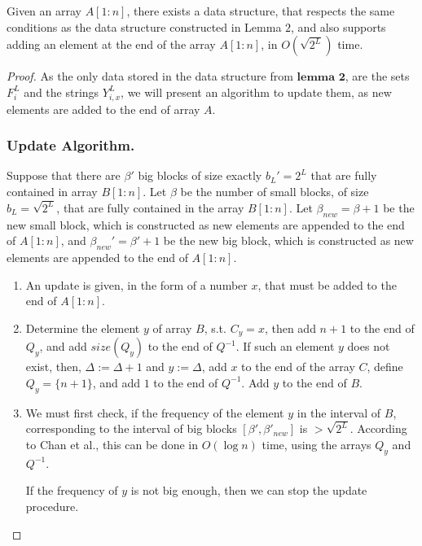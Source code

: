 \documentclass[runningheads]{llncs}
\begin{document}
\begin{lemma}
    Given an array $A[1:n]$, there exists a data structure, that respects the same conditions as the data structure constructed in 
    Lemma $2$, and also supports adding an element at the end of the array $A[1:n]$, in $O(\sqrt{2^L})$ time.

\end{lemma}
\begin{proof}
    As the only data stored in the data structure from $\textbf{lemma 2}$, are the sets $F^L_i$ and the strings $Y^L_{i,x}$, 
    we will present an algorithm to update them, as new elements are added to the end of array $A$.

    \subsubsection{Update Algorithm.}
    Suppose that there are $\beta'$ big blocks of size exactly $b_L'=2^L$ that are fully contained in array $B[1:n]$. 
    Let $\beta$ be the number of small blocks, of size $b_L=\sqrt{2^L}$, that are fully contained in the array $B[1:n]$. 
    Let $\beta_{new}=\beta+1$ be the new small block, which is constructed as new elements are appended to the end of $A[1:n]$, 
    and $\beta_{new}'=\beta'+1$ be the new big block, which is constructed as new elements are appended to the end of $A[1:n]$.

    \begin{enumerate}
        \item[] An update is given, in the form of a number $x$, that must be added to the end of $A[1:n]$.
        
        \item Determine the element $y$ of array $B$, s.t. $C_{y}=x$, then add $n+1$ to the end of $Q_{y}$, and add $size(Q_{y})$ to the end of $Q^{-1}$.
        If such an element $y$ does not exist, then, $\Delta := \Delta+1$ and $y:=\Delta$, 
        add $x$ to the end of the array $C$, define $Q_{y}=\{n+1\}$, and add $1$ to the end of $Q^{-1}$. Add $y$ to the end of $B$. 
        
        \item We must first check, if the frequency of the element $y$ in the interval of $B$, 
        corresponding to the interval of big blocks $[\beta', \beta'_{new}]$ is $>\sqrt{2^L}$. 
        According to Chan et al.\cite{chan2014linear}, this can be done in $O(\log n)$ time, using the arrays $Q_{y}$ and $Q^{-1}$.

        If the frequency of $y$ is not big enough, then we can stop the update procedure.


\end{enumerate}
\end{proof}
\end{document}
